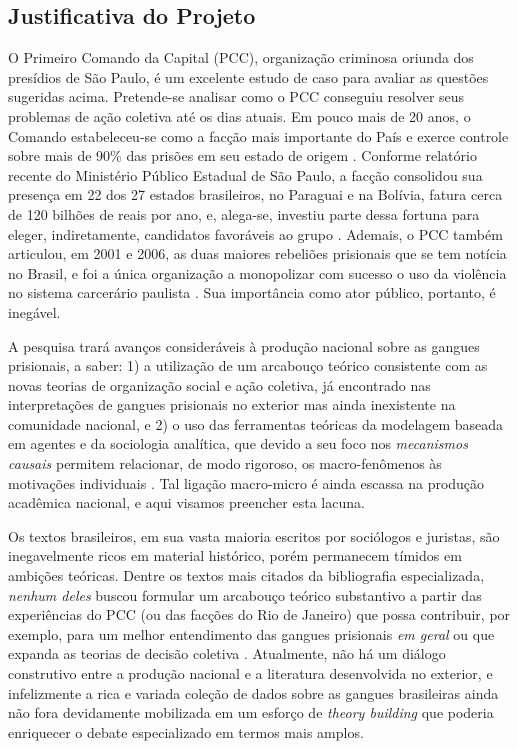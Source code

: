 \documentclass[a4paper,11pt]{article}
\begin{document}
\subsection{Justificativa do Projeto}

O Primeiro Comando da Capital (PCC), organização criminosa oriunda dos presídios de São Paulo, é um excelente estudo de caso para avaliar as questões sugeridas acima. Pretende-se analisar como o PCC conseguiu resolver seus problemas de ação coletiva até os dias atuais. Em pouco mais de 20 anos, o Comando estabeleceu-se como a facção mais importante do País e exerce controle sobre mais de 90\% das prisões em seu estado de origem \citep{biondi2008etica}. Conforme relatório recente do Ministério Público Estadual de São Paulo, a facção consolidou sua presença em 22 dos 27 estados brasileiros, no Paraguai e na Bolívia, fatura cerca de 120 bilhões de reais por ano, e, alega-se, investiu parte dessa fortuna para eleger, indiretamente, candidatos favoráveis ao grupo \citep{veja2013}. Ademais, o PCC também articulou, em 2001 e 2006, as duas maiores rebeliões prisionais que se tem notícia no Brasil, e foi a única organização a monopolizar com sucesso o uso da violência no sistema carcerário paulista  \citep{dias2009guerra}. Sua importância como ator público, portanto, é inegável.

A pesquisa trará avanços consideráveis à produção nacional sobre as gangues prisionais, a saber: 1) a utilização de um arcabouço teórico consistente com as novas teorias de organização social e ação coletiva, já encontrado nas interpretações de gangues prisionais no exterior mas ainda inexistente na comunidade nacional, e 2) o uso das ferramentas teóricas da modelagem baseada em agentes e da sociologia analítica, que devido a seu foco nos \textit{mecanismos causais} permitem relacionar, de modo rigoroso, os macro-fenômenos às motivações individuais \citep{hedstrom1998social}. Tal ligação macro-micro é ainda escassa na produção acadêmica nacional, e aqui visamos preencher esta lacuna.

Os textos brasileiros, em sua vasta maioria escritos por sociólogos e juristas, são inegavelmente ricos em material histórico, porém permanecem tímidos em ambições teóricas. Dentre os textos mais citados da bibliografia especializada, \textit{nenhum deles} buscou formular um arcabouço teórico substantivo a partir das experiências do PCC (ou das facções do Rio de Janeiro) que possa contribuir, por exemplo, para um melhor entendimento das gangues prisionais \textit{em geral} ou que expanda as teorias de decisão coletiva \citep[365]{dias2011pulverizaccao}. Atualmente, não há um diálogo construtivo entre a produção nacional e a literatura desenvolvida no exterior, e infelizmente a rica e variada coleção de dados sobre as gangues brasileiras ainda não fora devidamente mobilizada em um esforço de \textit{theory building} que poderia enriquecer o debate especializado em termos mais amplos. 
\end{document}
